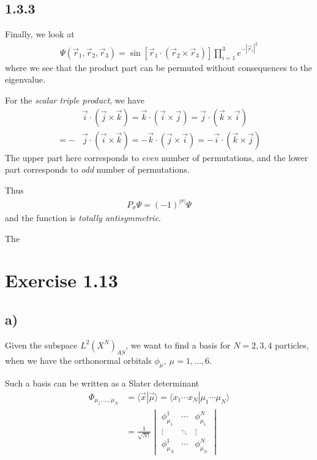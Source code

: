 \documentclass[norsk, 12pt]{article}
\newcommand{\la}{\langle}
\newcommand{\ra}{\rangle}
\newcommand{\vm}[1]{\begin{vmatrix}#1\end{vmatrix}}
\begin{document}
\subsection*{1.3.3}
Finally, we look at
\begin{align*}
	\Psi(\vec r_1, \vec r_2, \vec r_3) =
	\sin[\vec r_1 \cdot(\vec r_2\times \vec r_3)]
	\prod_{i=1}^{3}e^{-|\vec r_i|^2}
\end{align*}
where we see that the product part can be permuted without consequences to the
eigenvalue.

For the \textit{scalar triple product}, we have
\begin{align*}
	&\vec i\cdot(\vec j\times\vec k) = \vec k\cdot(\vec i\times\vec j)
	=\vec j\cdot(\vec k\times\vec i)\\
	=-&\vec j\cdot(\vec i\times\vec k)=-\vec k\cdot(\vec j\times\vec i)=
	-\vec i\cdot(\vec k\times\vec j)
\end{align*}
The upper part here corresponds to \textit{even} number of permutations,
and the lower part corresponds to \textit{odd} number of permutations.

Thus
\begin{align*}
    P_{\sigma}\Psi = (-1)^{|\sigma|}\Psi
\end{align*}
and the function is \textit{totally antisymmetric}.

The 



\section*{Exercise 1.13}
\label{sec:2}
\subsection*{a)}
\label{sub:1.13a}

Given the subspace $L^2(X^N)_{AS}$,
we want to find a basis for $N=2,3,4$ particles, when we have the orthonormal orbitals
$\phi_{\mu},\:\mu=1,…,6$.

Such a basis can be written as a Slater determinant
\begin{align*}
    \Phi_{\mu_1,...,\mu_N} &= \la \vec x| \vec\mu\ra 
    = \la x_1\cdots x_N | \mu_1\cdots\mu_N \ra\\
    &=\frac{1}{\sqrt{N!}}
    \vm{\phi_{\mu_1}^1&\cdots&\phi_{\mu_1}^N\\
    \vdots&\ddots&\vdots\\
    \phi_{\mu_N}^1&\cdots&\phi_{\mu_N}^N}
\end{align*}
\end{document}
